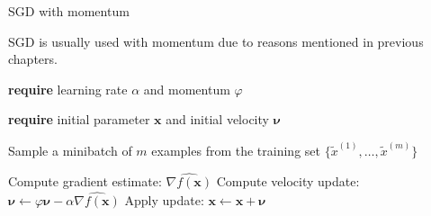 \documentclass[11pt,compress,t,notes=noshow, xcolor=table]{beamer}
\begin{document}


	

	



	 \begin{vbframe}{SGD with momentum}
		
	 	 SGD is usually used with momentum due to reasons mentioned in previous chapters.
	 	\begin{algorithm}[H]
	 		\small
	 		\caption{Stochastic gradient descent with momentum}
	 		\begin{algorithmic}[1]
	 			\State \textbf{require} learning rate $\alpha$ and momentum $\varphi$ \strut
	 			\State \textbf{require} initial parameter $\bm{x}$ and initial velocity $\bm{\nu}$ \strut
	 			\State \parbox[t]{\dimexpr\linewidth-\algorithmicindent}{Sample a minibatch of $m$ examples from the training set $\{\tilde{x}^{(1)},\dots,\tilde{x}^{(m)}\}$}
	 			\State Compute gradient estimate: $\hat{\nabla f(\bm{x})}$ %
	 			\State Compute velocity update: $\bm{\nu} \leftarrow \varphi \bm{\nu} - \alpha \hat{\nabla f(\bm{x})}$
	 			\State Apply update: $\bm{x} \leftarrow \bm{x} + \bm{\nu}$
	 			\EndWhile
	 		\end{algorithmic}
	 	\end{algorithm}
	 \end{vbframe}
\end{document}
